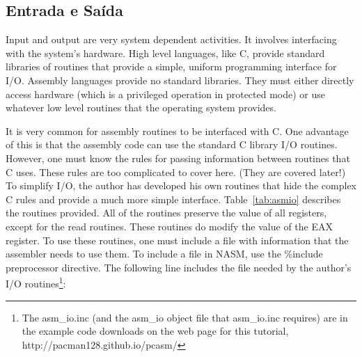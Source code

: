 \subsection{Entrada e Saída }

Input and output are very system dependent activities. It involves
interfacing with the system's hardware. High level languages, like C,
provide standard libraries of routines that provide a simple, uniform
programming interface for I/O.  Assembly languages provide no standard
libraries. They must either directly access hardware (which is a privileged
operation in protected mode) or use whatever low level routines that the
operating system provides.

It is very common for assembly routines to be interfaced with C. One
advantage of this is that the assembly code can use the standard C
library I/O routines.  However, one must know the rules for passing
information between routines that C uses. These rules are too
complicated to cover here. (They are covered later!) To simplify I/O,
the author has developed his own routines that hide the complex C
rules and provide a much more simple interface.  Table~\ref{tab:asmio}
describes the routines provided. All of the routines preserve the
value of all registers, except for the read routines. These routines
do modify the value of the EAX register. To use these routines, one
must include a file with information that the assembler needs to use
them.  To include a file in NASM, use the {\code \%include}
preprocessor directive. The following line includes the file needed by
the author's I/O routines\footnote{The {\code asm\_io.inc} (and the
{\code asm\_io} object file that {\code asm\_io.inc} requires) are in
the example code downloads on the web page for this tutorial, {\code
http://pacman128.github.io/pcasm/}}:
\begin{AsmCodeListing}[frame=none, numbers=none]
\end{AsmCodeListing}

